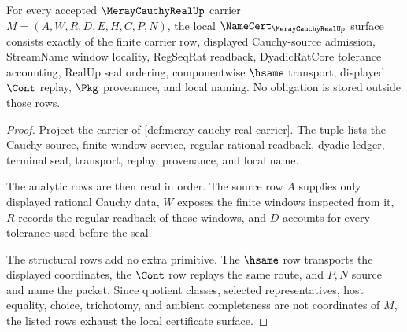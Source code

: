 \begin{theorem}
\label{thm:meray-cauchy-real-namecert-obligations}
For every accepted $\MerayCauchyRealUp$ carrier $M=(A,W,R,D,E,H,C,P,N)$, the local $\NameCert_{\MerayCauchyRealUp}$ surface consists exactly of the finite carrier row, displayed Cauchy-source admission, StreamName window locality, RegSeqRat readback, DyadicRatCore tolerance accounting, RealUp seal ordering, componentwise $\hsame$ transport, displayed $\Cont$ replay, $\Pkg$ provenance, and local naming. No obligation is stored outside those rows.
\end{theorem}
\begin{proof}
Project the carrier of \autoref{def:meray-cauchy-real-carrier}. The tuple lists the Cauchy source, finite window service, regular rational readback, dyadic ledger, terminal seal, transport, replay, provenance, and local name.

The analytic rows are then read in order. The source row $A$ supplies only displayed rational Cauchy data, $W$ exposes the finite windows inspected from it, $R$ records the regular readback of those windows, and $D$ accounts for every tolerance used before the seal.

The structural rows add no extra primitive. The $\hsame$ row transports the displayed coordinates, the $\Cont$ row replays the same route, and $P,N$ source and name the packet. Since quotient classes, selected representatives, host equality, choice, trichotomy, and ambient completeness are not coordinates of $M$, the listed rows exhaust the local certificate surface.
\end{proof}


